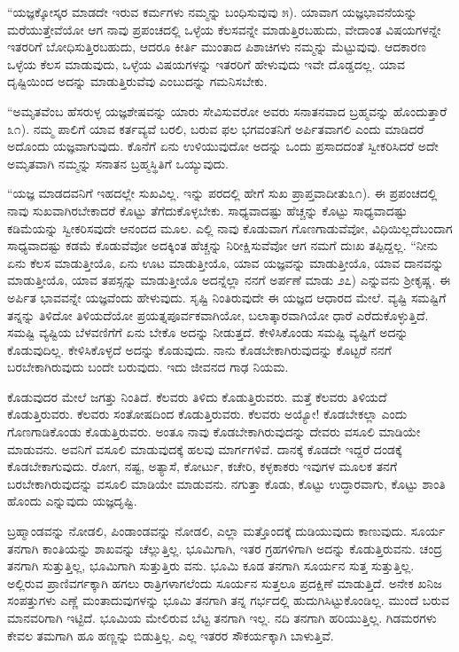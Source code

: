 “ಯಜ್ಞಕ್ಕೋಸ್ಕರ ಮಾಡದೇ ಇರುವ ಕರ್ಮಗಳು ನಮ್ಮನ್ನು ಬಂಧಿಸುವುವು ೫). ಯಾವಾಗ ಯಜ್ಞಭಾವನೆಯನ್ನು ಮರೆಯುತ್ತೇವೆಯೋ ಆಗ ನಾವು ಪ್ರಪಂಚದಲ್ಲಿ ಒಳ್ಳೆಯ ಕೆಲಸವನ್ನೇ ಮಾಡುತ್ತಿರಬಹುದು, ವೇದಾಂತ ವಿಷಯಗಳನ್ನೇ ಇತರರಿಗೆ ಬೋಧಿಸುತ್ತಿರಬಹುದು, ಆದರೂ ಕೀರ್ತಿ ಮುಂತಾದ ಪಿಶಾಚಿಗಳು ನಮ್ಮನ್ನು ಮೆಟ್ಟುವುವು. ಆದಕಾರಣ ಒಳ್ಳೆಯ ಕೆಲಸ ಮಾಡುವುದು, ಒಳ್ಳೆಯ ವಿಷಯಗಳನ್ನು ಇತರರಿಗೆ ಹೇಳುವುದು ಇವೇ ದೊಡ್ಡದಲ್ಲ. ಯಾವ ದೃಷ್ಟಿಯಿಂದ ಅದನ್ನು ಮಾಡುತ್ತಿರುವೆವು ಎಂಬುದನ್ನು ಗಮನಿಸಬೇಕು.

“ಅಮೃತವೆಂಬ ಹೆಸರುಳ್ಳ ಯಜ್ಞಶೇಷವನ್ನು ಯಾರು ಸೇವಿಸುವರೋ ಅವರು ಸನಾತನವಾದ ಬ್ರಹ್ಮವನ್ನು ಹೊಂದುತ್ತಾರೆ ೩೧). ನಮ್ಮ ಪಾಲಿಗೆ ಯಾವ ಕರ್ತವ್ಯವೆ ಬರಲಿ, ಬರುವ ಫಲ ಭಗವಂತನಿಗೆ ಅರ್ಪಿತವಾಗಲಿ ಎಂದು ಮಾಡಿದರೆ ಅದೊಂದು ಯಜ್ಞವಾಗುವುದು. ಕೊನೆಗೆ ಏನು ಉಳಿಯುವುದೋ ಅದನ್ನು ಒಂದು ಪ್ರಸಾದದಂತೆ ಸ್ವೀಕರಿಸಿದರೆ ಅದೇ ಅಮೃತವಾಗಿ ನಮ್ಮನ್ನು ಸನಾತನ ಬ್ರಹ್ಮಸ್ಥಿತಿಗೆ ಒಯ್ಯುವುದು.

“ಯಜ್ಞ ಮಾಡದವನಿಗೆ ಇಹದಲ್ಲೇ ಸುಖವಿಲ್ಲ. ಇನ್ನು ಪರದಲ್ಲಿ ಹೇಗೆ ಸುಖ ಪ್ರಾಪ್ತ\-ವಾದೀತು೩೧). ಈ ಪ್ರಪಂಚದಲ್ಲಿ ನಾವು ಸುಖವಾಗಿರಬೇಕಾದರೆ ಕೊಟ್ಟು ತೆಗೆದುಕೊಳ್ಳಬೇಕು. ಸಾಧ್ಯವಾದಷ್ಟು ಹೆಚ್ಚನ್ನು ಕೊಟ್ಟು ಸಾಧ್ಯವಾದಷ್ಟು ಕಡಿಮೆಯನ್ನು ಸ್ವೀಕರಿಸವುದೇ ಆನಂದದ ಮೂಲ. ಎಲ್ಲಿ ನಾವು ಕೊಡುವಾಗ ಗೊಣಗಾಡುವೆವೋ, ವಿಧಿಯಿಲ್ಲದೆ\break ಬಂದಾಗ ಸಾಧ್ಯವಾದಷ್ಟು ಕಡಮೆ ಕೊಡುವೆವೋ ಅದಕ್ಕಿಂತ ಹೆಚ್ಚನ್ನು ನಿರೀಕ್ಷಿಸುವೆವೋ ಆಗ ನಮಗೆ ದುಃಖ ತಪ್ಪಿದ್ದಲ್ಲ. “ನೀನು ಏನು ಕೆಲಸ ಮಾಡುತ್ತೀಯೊ, ಏನು ಊಟ ಮಾಡುತ್ತೀಯೊ, ಯಾವ ಯಜ್ಞವನ್ನು ಮಾಡುತ್ತೀಯೊ, ಯಾವ ದಾನವನ್ನು ಮಾಡುತ್ತೀಯೊ, ಯಾವ ತಪಸ್ಸನ್ನು ಮಾಡುತ್ತೀಯೊ ಅದನ್ನೆಲ್ಲಾ ನನಗೆ ಅರ್ಪಣೆ ಮಾಡು ೨೭) ಎನ್ನುವನು ಶ‍್ರೀಕೃಷ್ಣ. ಈ ಅರ್ಪಿತ ಭಾವವನ್ನೇ ಯಜ್ಞವೆಂದು ಹೇಳುವುದು. ಸೃಷ್ಟಿ ನಿಂತಿರುವುದೇ ಈ ಯಜ್ಞದ ಆಧಾರದ ಮೇಲೆ. ವ್ಯಷ್ಟಿ ಸಮಷ್ಟಿಗೆ ತನ್ನನ್ನು ತಿಳಿದೋ ತಿಳಿಯದೆಯೋ ಪ್ರಯತ್ನಪೂರ್ವಕವಾಗಿಯೋ, ಬಲಾತ್ಕಾರವಾಗಿಯೋ ಧಾರೆ ಎರೆದುಕೊಳ್ಳುತ್ತಿದೆ. ಸಮಷ್ಟಿ ವ್ಯಷ್ಟಿಯ ಬೆಳವಣಿಗೆಗೆ ಏನು ಬೇಕೊ ಅದನ್ನು ನೀಡುತ್ತದೆ. ಕೇಳಿಸಿಕೊಂಡು ಸಮಷ್ಟಿ ವ್ಯಷ್ಟಿಗೆ ಅದನ್ನು ಕೊಡುವುದಿಲ್ಲ. ಕೇಳಿಸಿಕೊಳ್ಳದೆ ಅದನ್ನು ಕೊಡುವುದು. ನಾನು ಕೊಡಬೇಕಾಗಿರುವುದನ್ನು ಕೊಟ್ಟರೆ ನನಗೆ ಬರಬೇಕಾಗಿರುವುದು ಬಂದೇ ಬರುವುದು. ಇದು ಜೀವನದ ಗಾಢ ನಿಯಮ.

ಕೊಡುವುದರ ಮೇಲೆ ಜಗತ್ತು ನಿಂತಿದೆ. ಕೆಲವರು ತಿಳಿದು ಕೊಡುತ್ತಿರುವರು. ಮತ್ತೆ ಕೆಲವರು ತಿಳಿಯದೆ ಕೊಡುತ್ತಿರುವರು. ಕೆಲವರು ಸಂತೋಷದಿಂದ ಕೊಡುತ್ತಿರುವರು. ಕೆಲವರು ಅಯ್ಯೋ! ಕೊಡಬೇಕಲ್ಲಾ ಎಂದು ಗೊಣಗಾಡಿಕೊಂಡು ಕೊಡುತ್ತಿರುವರು. ಅಂತೂ ನಾವು ಕೊಡಬೇಕಾಗಿರುವುದನ್ನು ದೇವರು ವಸೂಲಿ ಮಾಡಿಯೇ ಮಾಡುವನು. ಅವನಿಗೆ ವಸೂಲಿ ಮಾಡುವುದಕ್ಕೆ ಹಲವು ಮಾರ್ಗಗಳಿವೆ. ದಾನಕ್ಕೆ ಕೊಡದೇ ಇದ್ದರೆ ದಂಡಕ್ಕೆ ಕೊಡಬೇಕಾಗುವುದು. ರೋಗ, ನಷ್ಟ, ಅತ್ಯಾಸೆ, ಕೋರ್ಟು, ಕಚೇರಿ, ಕಳ್ಳಕಾಕರು ಇವುಗಳ ಮೂಲಕ ತನಗೆ ಬರಬೇಕಾಗಿರುವುದನ್ನು ವಸೂಲಿ ಮಾಡಿಯೇ ಮಾಡುವನು. ನಗುತ್ತಾ ಕೊಡು, ಕೊಟ್ಟು ಉದ್ಧಾರವಾಗು, ಕೊಟ್ಟು ಶಾಂತಿ ಹೊಂದು ಎನ್ನುವುದು ಯಜ್ಞದೃಷ್ಟಿ.

ಬ್ರಹ್ಮಾಂಡವನ್ನು ನೋಡಲಿ, ಪಿಂಡಾಂಡವನ್ನು ನೋಡಲಿ, ಎಲ್ಲಾ ಮತ್ತೊಂದಕ್ಕೆ ದುಡಿಯುವುದು ಕಾಣುವುದು. ಸೂರ್ಯ ತನಗಾಗಿ ಕಾಂತಿಯನ್ನು ಶಾಖವನ್ನು ಚೆಲ್ಲುತ್ತಿಲ್ಲ. ಭೂಮಿಗಾಗಿ, ಇತರ ಗ್ರಹಗಳಿಗಾಗಿ ಅದನ್ನು ಕೊಡುತ್ತಿರುವನು. ಚಂದ್ರ ತನಗಾಗಿ ಸುತ್ತುತ್ತಿಲ್ಲ, ಭೂಮಿಗಾಗಿ ಸುತ್ತುತ್ತಿರು ವನು. ಭೂಮಿ ಕೂಡ ತನಗಾಗಿ ಸೂರ್ಯನ ಸುತ್ತ ಸುತ್ತುತ್ತಿಲ್ಲ. ಅಲ್ಲಿರುವ ಪ್ರಾಣಿವರ್ಗಕ್ಕಾಗಿ ಹಗಲು ರಾತ್ರಿಗಳಾಗಲೆಂದು ಸೂರ್ಯನ ಸುತ್ತಲೂ ಪ್ರದಕ್ಷಿಣೆ ಮಾಡುತ್ತಿದೆ. ಅನೇಕ ಖನಿಜ ಸಂಪತ್ತುಗಳು ಎಣ್ಣೆ ಮಂತಾದುವುಗಳನ್ನು ಭೂಮಿ ತನಗಾಗಿ ತನ್ನ ಗರ್ಭದಲ್ಲಿ ಹುದುಗಿಸಿಟ್ಟುಕೊಂಡಿಲ್ಲ. ಮುಂದೆ ಬರುವ ಮಾನವರಿಗಾಗಿ ಇಟ್ಟಿದೆ. ಭೂಮಿಯ ಮೇಲಿರುವ ಬೆಟ್ಟ ತನಗಾಗಿ ಇಲ್ಲ. ನದಿ ತನಗಾಗಿ ಹರಿಯುತ್ತಿಲ್ಲ. ಗಿಡಮರಗಳು ಕೇವಲ ತಮಗಾಗಿ ಹೂ ಹಣ್ಣನ್ನು ಬಿಡುತ್ತಿಲ್ಲ. ಎಲ್ಲ ಇತರರ ಸೌಕರ್ಯಕ್ಕಾಗಿ ಬಾಳುತ್ತಿವೆ.

